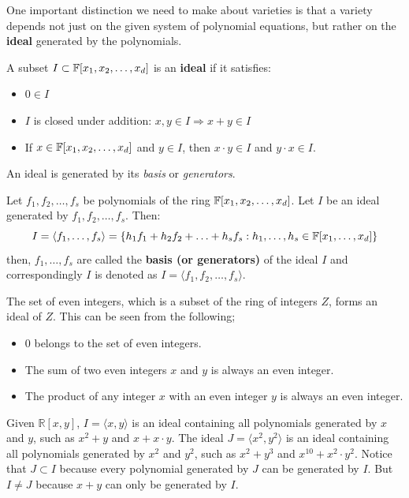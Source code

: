One important distinction we need to make about varieties is that a
variety depends not just on the given system of polynomial 
equations, but rather on the {\bf ideal} generated by the polynomials.

\begin{Definition} 
A subset $I \subset {\mathbb{F}}[x_1, x_2, \ldots, x_d]$ is an {
\bf ideal} if it satisfies:
\begin{itemize}
\item $0 \in I$
\item $I$ is closed under addition: $x, y \in I \Rightarrow x+y \in I$
\item If $x \in {\mathbb{F}}[x_1, x_2, \ldots, x_d]$ and $y \in I$, then $x\cdot y \in I$ and $y\cdot x \in  I$.
\end{itemize}
\end{Definition}

An ideal is generated by its {\it basis} or {\it generators}.

\begin{Definition}
Let $f_1, f_2, \ldots, f_s$ be 
polynomials of the ring ${\mathbb{F}}[x_1, x_2, \ldots, x_d]$. 
Let $I$ be an ideal generated by $f_1, f_2, \ldots, f_s$. Then:
\begin{equation}
I = \langle f_1,\dots,f_s \rangle=\{h_1 f_1 + h_2 f_2 + \ldots + h_s f_s : h_1,\dots,h_s\in{\mathbb{F}}[x_1, \dots, x_d]\} \nonumber
\end{equation}
then, $f_1, \ldots, f_s$ are called the {\bf basis (or generators)} of the 
ideal $I$ and correspondingly $I$ is denoted as $I = \langle f_1, f_2, 
\ldots, f_s \rangle$. 
\end{Definition}

\begin{Example}
The set of even integers, which is a subset of the ring of integers
$Z$, forms an ideal of $Z$. This can be seen from the following;
\begin{itemize}
\item $0$ belongs to the set of even integers.
\item The sum of two even integers $x$ and $y$ is always an even
  integer.
\item The product of any integer $x$ with an even integer $y$ is
  always an even integer.
\end{itemize}
\end{Example}

\begin{Example}
Given $\mathbb{R}\left[x,y\right]$, $I = \langle x, y \rangle$ is an 
ideal containing all polynomials generated by $x$ and $y$, 
such as $x^2+y$ and $x+x\cdot y$. The ideal
$J = \langle x^2, y^2 \rangle$ is an ideal containing all polynomials 
generated by $x^2$ and $y^2$, such as $x^2+y^3$ and $x^{10}+x^2\cdot y^2$. 
Notice that $J\subset I$ because every polynomial generated by $J$ can
be generated by $I$. 
But $I\neq J$ because $x+y$ can only be generated by $I$.
\end{Example}

